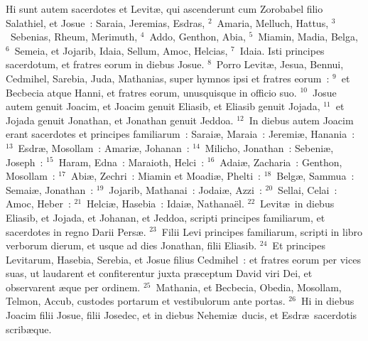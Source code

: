 \lettrine[lines=10,image=true,loversize=0.05,lraise=-0.03]{H}{}i sunt autem sacerdotes et Levit\ae , qui ascenderunt cum Zorobabel filio Salathiel, et Josue~: Saraia, Jeremias, Esdras,
${}^{2}$~Amaria, Melluch, Hattus,
${}^{3}$~Sebenias, Rheum, Merimuth,
${}^{4}$~Addo, Genthon, Abia,
${}^{5}$~Miamin, Madia, Belga,
${}^{6}$~Semeia, et Jojarib, Idaia, Sellum, Amoc, Helcias,
${}^{7}$~Idaia. Isti principes sacerdotum, et fratres eorum in diebus Josue.
${}^{8}$~Porro Levit\ae , Jesua, Bennui, Cedmihel, Sarebia, Juda, Mathanias, super hymnos ipsi et fratres eorum~:
${}^{9}$~et Becbecia atque Hanni, et fratres eorum, unusquisque in officio suo.
${}^{10}$~Josue autem genuit Joacim, et Joacim genuit Eliasib, et Eliasib genuit Jojada,
${}^{11}$~et Jojada genuit Jonathan, et Jonathan genuit Jeddoa.
${}^{12}$~In diebus autem Joacim erant sacerdotes et principes familiarum~: Sarai\ae , Maraia~: Jeremi\ae , Hanania~:
${}^{13}$~Esdr\ae , Mosollam~: Amari\ae , Johanan~:
${}^{14}$~Milicho, Jonathan~: Sebeni\ae , Joseph~:
${}^{15}$~Haram, Edna~: Maraioth, Helci~:
${}^{16}$~Adai\ae , Zacharia~: Genthon, Mosollam~:
${}^{17}$~Abi\ae , Zechri~: Miamin et Moadi\ae , Phelti~:
${}^{18}$~Belg\ae , Sammua~: Semai\ae , Jonathan~:
${}^{19}$~Jojarib, Mathanai~: Jodai\ae , Azzi~:
${}^{20}$~Sellai, Celai~: Amoc, Heber~:
${}^{21}$~Helci\ae , Hasebia~: Idai\ae , Nathana\"el.
${}^{22}$~Levit\ae\ in diebus Eliasib, et Jojada, et Johanan, et Jeddoa, scripti principes familiarum, et sacerdotes in regno Darii Pers\ae .
${}^{23}$~Filii Levi principes familiarum, scripti in libro verborum dierum, et usque ad dies Jonathan, filii Eliasib.
${}^{24}$~Et principes Levitarum, Hasebia, Serebia, et Josue filius Cedmihel~: et fratres eorum per vices suas, ut laudarent et confiterentur juxta pr\ae ceptum David viri Dei, et observarent \ae que per ordinem.
${}^{25}$~Mathania, et Becbecia, Obedia, Mosollam, Telmon, Accub, custodes portarum et vestibulorum ante portas.
${}^{26}$~Hi in diebus Joacim filii Josue, filii Josedec, et in diebus Nehemi\ae\ ducis, et Esdr\ae\ sacerdotis scrib\ae que.


